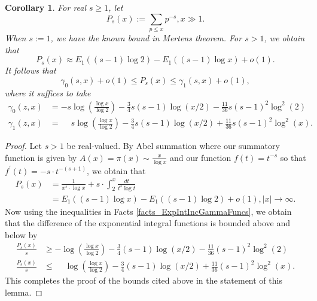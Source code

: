 \documentclass[11pt,reqno,a4letter]{article}
\numberwithin{figure}{section}
\numberwithin{table}{section}
\theoremstyle{plain}
\newtheorem{cor}[theorem]{Corollary}
\numberwithin{theorem}{section}
\theoremstyle{definition}
\begin{document}
\begin{cor} 
\label{cor_PartialSumsOfReciprocalsOfPrimePowers} 
For real $s \geq 1$, let 
\[
P_s(x) := \sum_{p \leq x} p^{-s}, x \gg 1. 
\]
When $s := 1$, we have the known bound in Mertens theorem. For $s > 1$, we obtain that 
\[
P_s(x) \approx E_1((s-1) \log 2) - E_1((s-1) \log x) + o(1). 
\]
It follows that 
\[
\gamma_0(s, x) + o(1) \leq P_s(x) \leq \gamma_1(s, x) + o(1), 
\]
where it suffices to take 
\begin{align*}
\gamma_0(z, x) & = -s\log\left(\frac{\log x}{\log 2}\right) - \frac{3}{4}s(s-1) \log(x/2) - 
     \frac{11}{36} s(s-1)^2 \log^2(2) \\ 
\gamma_1(z, x) & = \phantom{-} s\log\left(\frac{\log x}{\log 2}\right) - \frac{3}{4}s(s-1) \log(x/2) + 
     \frac{11}{36} s(s-1)^2 \log^2(x). 
\end{align*}
\end{cor} 
\begin{proof} 
Let $s > 1$ be real-valued. 
By Abel summation where our summatory function is given by $A(x) = \pi(x) \sim \frac{x}{\log x}$ and 
our function $f(t) = t^{-s}$ so that $f^{\prime}(t) = -s \cdot t^{-(s+1)}$, we obtain that 
\begin{align*} 
P_s(x) & = \frac{1}{x^s \cdot \log x} + s \cdot \int_2^{x} \frac{dt}{t^s \log t} \\ 
     & = E_1((s-1) \log x) - E_1((s-1) \log 2) + o(1), |x| \rightarrow \infty. 
\end{align*} 
Now using the inequalities in Facts \ref{facts_ExpIntIncGammaFuncs}, we obtain that the 
difference of the exponential integral functions is bounded above and below by 
\begin{align*} 
\frac{P_s(x)}{s} & \geq -\log\left(\frac{\log x}{\log 2}\right) - \frac{3}{4}(s-1) \log(x/2) - 
     \frac{11}{36} (s-1)^2 \log^2(2) \\ 
\frac{P_s(x)}{s} & \leq \phantom{-} \log\left(\frac{\log x}{\log 2}\right) - \frac{3}{4}(s-1) \log(x/2) + 
     \frac{11}{36} (s-1)^2 \log^2(x). 
\end{align*} 
This completes the proof of the bounds cited above in the statement of this lemma. 
\end{proof} 
\end{document}
